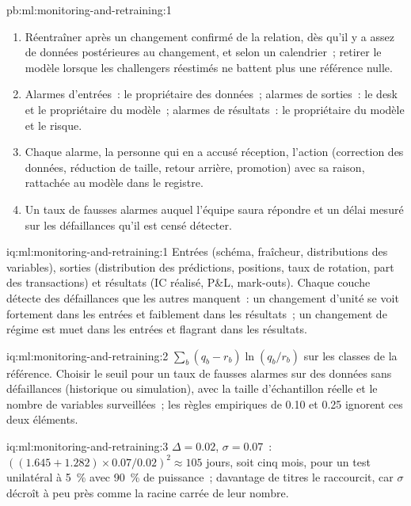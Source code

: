 \begin{solution}{pb:ml:monitoring-and-retraining:1}
\begin{enumerate}[resume]
\item Réentraîner après un changement confirmé de la relation, dès qu'il y a assez de données postérieures au changement, et selon un calendrier~; retirer le modèle lorsque
les challengers réestimés ne battent plus une référence nulle.
\item Alarmes d'entrées~: le propriétaire des données~; alarmes de sorties~: le desk et le propriétaire du modèle~; alarmes de résultats~: le propriétaire du modèle et le risque.
\item Chaque alarme, la personne qui en a accusé réception, l'action (correction des données, réduction de taille, retour arrière, promotion) avec sa raison, rattachée au
modèle dans le registre.
\item Un taux de fausses alarmes auquel l'équipe saura répondre et un délai mesuré sur les défaillances qu'il est censé détecter.
\end{enumerate}
\end{solution}

\begin{solution}{iq:ml:monitoring-and-retraining:1}
Entrées (schéma, fraîcheur, distributions des variables), sorties (distribution des prédictions, positions, taux de rotation, part des transactions) et
résultats (IC réalisé, P\&L, mark-outs). Chaque couche détecte des défaillances que les autres manquent~: un changement d'unité se voit fortement dans les entrées et faiblement dans
les résultats~; un changement de régime est muet dans les entrées et flagrant dans les résultats.
\end{solution}

\begin{solution}{iq:ml:monitoring-and-retraining:2}
$\sum_b(q_b-r_b)\ln(q_b/r_b)$ sur les classes de la référence. Choisir le seuil pour un taux de fausses alarmes sur des données sans défaillances
(historique ou simulation), avec la taille d'échantillon réelle et le nombre de variables surveillées~; les règles empiriques de 0.10 et 0.25 ignorent
ces deux éléments.
\end{solution}

\begin{solution}{iq:ml:monitoring-and-retraining:3}
$\Delta=0.02$, $\sigma=0.07$~: $((1.645+1.282)\times0.07/0.02)^2\approx105$ jours, soit cinq mois, pour un test unilatéral à 5~\% avec 90~\%
de puissance~; davantage de titres le raccourcit, car $\sigma$ décroît à peu près comme la racine carrée de leur nombre.
\end{solution}

